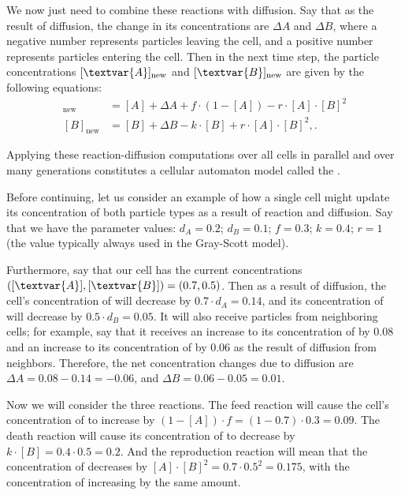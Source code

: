 We now just need to combine these reactions with diffusion. Say that as the result of diffusion, the change in its concentrations are $\Delta A$ and $\Delta B$, where a negative number represents particles leaving the cell, and a positive number represents particles entering the cell. Then in the next time step, the particle concentrations $[\textvar{A}]_{\text{new}}$ and $[\textvar{B}]_{\text{new}}$ are given by the following equations:
\begin{align*}
[A]_{\text{new}} & = [A] + \Delta A + f \cdot (1-[A]) - r \cdot [A] \cdot [B]^2\\
[B]_{\text{new}} & = [B] + \Delta B - k \cdot [B] + r \cdot [A] \cdot [B]^2,.
\end{align*}

\noindent Applying these reaction-diffusion computations over all cells in parallel and over many generations constitutes a cellular automaton model called the .

Before continuing, let us consider an example of how a single cell might update its concentration of both particle types as a result of reaction and diffusion.  Say that we have the parameter values: $d_A = 0.2$; $d_B = 0.1$; $f = 0.3$; $k = 0.4$; $r = 1$ (the value typically always used in the Gray-Scott model).

Furthermore, say that our cell has the current concentrations $([\textvar{A}], [\textvar{B}]) = (0.7, 0.5)$. Then as a result of diffusion, the cell's concentration of  will decrease by $0.7 \cdot d_A = 0.14$, and its concentration of  will decrease by $0.5 \cdot d_B = 0.05$. It will also receive particles from neighboring cells; for example, say that it receives an increase to its concentration of  by 0.08 and an increase to its concentration of  by 0.06 as the result of diffusion from neighbors. Therefore, the net concentration changes due to diffusion are $\Delta A  = 0.08 - 0.14 = -0.06$, and $\Delta B = 0.06 - 0.05 = 0.01$.

Now we will consider the three reactions. The feed reaction will cause the cell's concentration of  to increase by $(1 - [A]) \cdot f = (1-0.7) \cdot 0.3 = 0.09$. The death reaction will cause its concentration of  to decrease by $k \cdot [B] = 0.4 \cdot 0.5 = 0.2$. And the reproduction reaction will mean that the concentration of  decreases by $[A] \cdot [B]^2 = 0.7 \cdot 0.5^2 = 0.175$, with the concentration of  increasing by the same amount.

